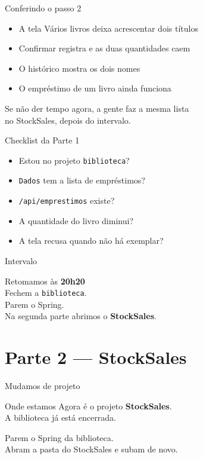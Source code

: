 \documentclass[aspectratio=169,11pt]{beamer}
\newcommand{\onde}[1]{%
  \begin{block}{Onde estamos}
    #1
  \end{block}
}
\begin{document}
\begin{frame}{Conferindo o passo 2}
  \begin{itemize}
    \item [ ] A tela Vários livros deixa acrescentar dois títulos
    \item [ ] Confirmar registra e as duas quantidades caem
    \item [ ] O histórico mostra os dois nomes
    \item [ ] O empréstimo de um livro ainda funciona
  \end{itemize}

  \vspace{0.5em}
  Se não der tempo agora, a gente faz a mesma lista\\
  no StockSales, depois do intervalo.
\end{frame}

\begin{frame}{Checklist da Parte 1}
  \begin{itemize}
    \item [ ] Estou no projeto \texttt{biblioteca}?
    \item [ ] \texttt{Dados} tem a lista de empréstimos?
    \item [ ] \texttt{/api/emprestimos} existe?
    \item [ ] A quantidade do livro diminui?
    \item [ ] A tela recusa quando não há exemplar?
  \end{itemize}
\end{frame}

\begin{frame}{Intervalo}
  \begin{center}
    \Large Retomamos às \textbf{20h20}\\[0.8em]
    \normalsize
    Fechem a \texttt{biblioteca}.\\
    Parem o Spring.\\
    Na segunda parte abrimos o \textbf{StockSales}.
  \end{center}
\end{frame}

\section{Parte 2 --- StockSales}

\begin{frame}{Mudamos de projeto}
  \onde{Agora é o projeto \textbf{StockSales}.\\
        A biblioteca já está encerrada.}

  Parem o Spring da biblioteca.\\
  Abram a pasta do StockSales e subam de novo.
\end{frame}
\end{document}
